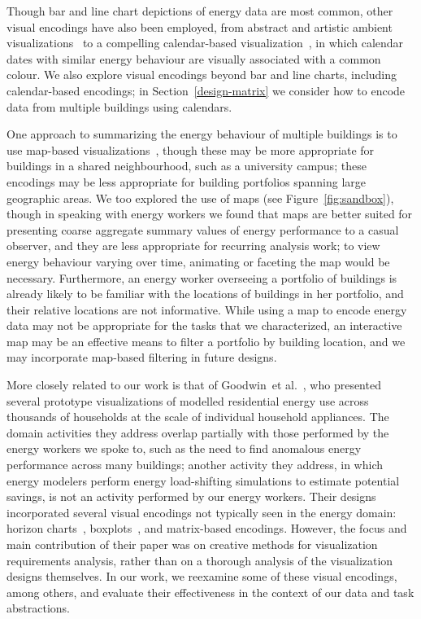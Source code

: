 \documentclass[journal]{vgtc}                %
\newcommand{\etal}{et al.}
\begin{document}
Though bar and line chart depictions of energy data are most common, other visual encodings have also been employed, from abstract and artistic ambient visualizations~\cite{Rodgers2011} to a compelling calendar-based visualization~\cite{vanWijk1999}, in which calendar dates with similar energy behaviour are visually associated with a common colour.
We also explore visual encodings beyond bar and line charts, including calendar-based encodings; in Section~\ref{design-matrix} we consider how to encode data from multiple buildings using calendars.

One approach to summarizing the energy behaviour of multiple buildings is to use map-based visualizations~\cite{Heat2014,MEP2014}, though these may be more appropriate for buildings in a shared neighbourhood, such as a university campus; these encodings may be less appropriate for building portfolios spanning large geographic areas.
We too explored the use of maps (see Figure~\ref{fig:sandbox}), though in speaking with energy workers we found that maps are better suited for presenting coarse aggregate summary values of energy performance to a casual observer, and they are less appropriate for recurring analysis work; to view energy behaviour varying over time, animating or faceting the map would be necessary.
Furthermore, an energy worker overseeing a portfolio of buildings is already likely to be familiar with the locations of buildings in her portfolio, and their relative locations are not informative.
While using a map to encode energy data may not be appropriate for the tasks that we characterized, an interactive map may be an effective means to filter a portfolio by building location, and we may incorporate map-based filtering in future designs.

More closely related to our work is that of Goodwin~\etal~\cite{Goodwin2013}, who presented several prototype visualizations of modelled residential energy use across thousands of households at the scale of individual household appliances. 
The domain activities they address overlap partially with those performed by the energy workers we spoke to, such as the need to find anomalous energy performance across many buildings; another activity they address, in which energy modelers perform energy load-shifting simulations to estimate potential savings, is not an activity performed by our energy workers. 
Their designs incorporated several visual encodings not typically seen in the energy domain: horizon charts~\cite{Heer2009}, boxplots~\cite{Wickham2011}, and matrix-based encodings.
However, the focus and main contribution of their paper was on creative methods for visualization requirements analysis, rather than on a thorough analysis of the visualization designs themselves.
In our work, we reexamine some of these visual encodings, among others, and evaluate their effectiveness in the context of our data and task abstractions. 
\end{document}
